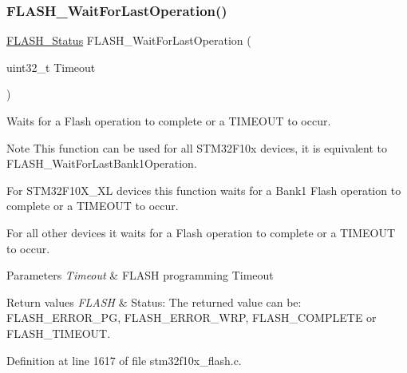 \subsubsection{\texorpdfstring{F\+L\+A\+S\+H\+\_\+\+Wait\+For\+Last\+Operation()}{FLASH\_WaitForLastOperation()}}
{\footnotesize\ttfamily \hyperlink{group___f_l_a_s_h___exported___types_gadc63a6f3404ff1f71229a66915e9cdc0}{F\+L\+A\+S\+H\+\_\+\+Status} F\+L\+A\+S\+H\+\_\+\+Wait\+For\+Last\+Operation (\begin{DoxyParamCaption}\item[{uint32\+\_\+t}]{Timeout }\end{DoxyParamCaption})}



Waits for a Flash operation to complete or a T\+I\+M\+E\+O\+UT to occur. 

\begin{DoxyNote}{Note}
This function can be used for all S\+T\+M32\+F10x devices, it is equivalent to F\+L\+A\+S\+H\+\_\+\+Wait\+For\+Last\+Bank1\+Operation.
\begin{DoxyItemize}
\item For S\+T\+M32\+F10\+X\+\_\+\+XL devices this function waits for a Bank1 Flash operation to complete or a T\+I\+M\+E\+O\+UT to occur.
\item For all other devices it waits for a Flash operation to complete or a T\+I\+M\+E\+O\+UT to occur. 
\end{DoxyItemize}
\end{DoxyNote}

\begin{DoxyParams}{Parameters}
{\em Timeout} & F\+L\+A\+SH programming Timeout \\
\hline
\end{DoxyParams}

\begin{DoxyRetVals}{Return values}
{\em F\+L\+A\+SH} & Status\+: The returned value can be\+: F\+L\+A\+S\+H\+\_\+\+E\+R\+R\+O\+R\+\_\+\+PG, F\+L\+A\+S\+H\+\_\+\+E\+R\+R\+O\+R\+\_\+\+W\+RP, F\+L\+A\+S\+H\+\_\+\+C\+O\+M\+P\+L\+E\+TE or F\+L\+A\+S\+H\+\_\+\+T\+I\+M\+E\+O\+UT. \\
\hline
\end{DoxyRetVals}


Definition at line 1617 of file stm32f10x\+\_\+flash.\+c.


